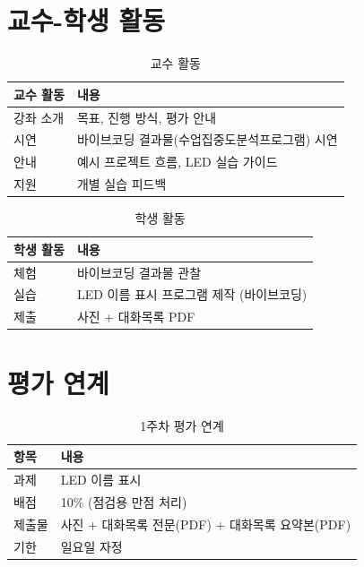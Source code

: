 \documentclass[11pt, a4paper]{article}
\begin{document}
\section{교수-학생 활동}

\begin{table}[H]
\centering
\begin{tabularx}{\textwidth}{l X}
\toprule
\textbf{교수 활동} & \textbf{내용} \\
\midrule
강좌 소개 & 목표, 진행 방식, 평가 안내 \\
시연 & 바이브코딩 결과물(수업집중도분석프로그램) 시연 \\
안내 & 예시 프로젝트 흐름, LED 실습 가이드 \\
지원 & 개별 실습 피드백 \\
\bottomrule
\end{tabularx}
\caption{교수 활동}
\end{table}

\begin{table}[H]
\centering
\begin{tabularx}{\textwidth}{l X}
\toprule
\textbf{학생 활동} & \textbf{내용} \\
\midrule
체험 & 바이브코딩 결과물 관찰 \\
실습 & LED 이름 표시 프로그램 제작 (바이브코딩) \\
제출 & 사진 + 대화목록 PDF \\
\bottomrule
\end{tabularx}
\caption{학생 활동}
\end{table}

\section{평가 연계}

\begin{table}[H]
\centering
\begin{tabularx}{\textwidth}{l X}
\toprule
\textbf{항목} & \textbf{내용} \\
\midrule
과제 & LED 이름 표시 \\
배점 & 10\% (점검용 만점 처리) \\
제출물 & 사진 + 대화목록 전문(PDF) + 대화목록 요약본(PDF) \\
기한 & 일요일 자정 \\
\bottomrule
\end{tabularx}
\caption{1주차 평가 연계}
\end{table}
\end{document}
